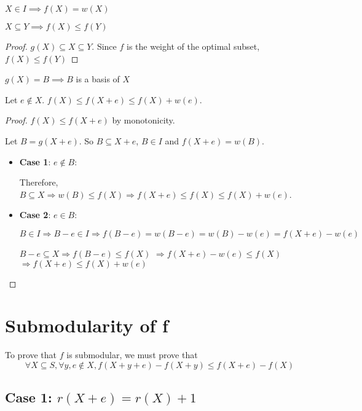 \begin{theorem} $X \in I \implies f(X) = w(X)$ \end{theorem}

\begin{theorem}[Monotonicity] $X \subseteq Y \implies f(X) \le f(Y)$ \end{theorem}
\begin{proof} $g(X) \subseteq X \subseteq Y$.
Since $f$ is the weight of the optimal subset, $f(X) \le f(Y)$ \end{proof}

\begin{theorem} $g(X) = B \implies B$ is a basis of $X$ \end{theorem}

\begin{theorem}
Let $e \not\in X$. $f(X) \le f(X+e) \le f(X) + w(e)$.
\end{theorem}
\begin{proof}
$f(X) \le f(X+e)$ by monotonicity.

Let $B = g(X+e)$. So $B \subseteq X+e$, $B \in I$ and $f(X+e) = w(B)$.
\begin{itemize}
\item \textbf{Case 1}: $e \not\in B$:

Therefore, $B \subseteq X \Rightarrow w(B) \le f(X) \Rightarrow f(X+e) \le f(X) \le f(X) + w(e)$.

\item \textbf{Case 2}: $e \in B$:

$B \in I \Rightarrow B-e \in I \Rightarrow f(B-e) = w(B-e) = w(B) - w(e) = f(X+e) - w(e)$

$B-e \subseteq X \Rightarrow f(B-e) \le f(X)$
$\Rightarrow f(X+e) - w(e) \le f(X)$
$\Rightarrow f(X+e) \le f(X) + w(e)$
\end{itemize}
\end{proof}

\section{Submodularity of f}

To prove that $f$ is submodular, we must prove that
\[ \forall X \subseteq S, \forall y,e \not\in X, f(X+y+e) - f(X+y) \le f(X+e) - f(X) \]

\subsection[Case 1: r(X+e) = r(X) + 1]{Case 1: $r(X+e) = r(X) + 1$}

